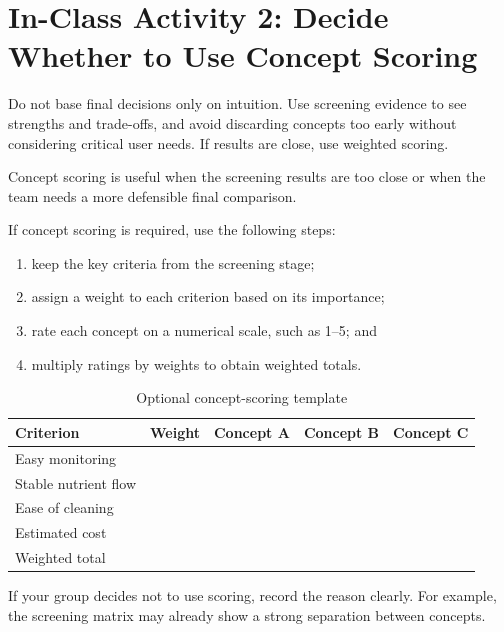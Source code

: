 \section{In-Class Activity 2: Decide Whether to Use Concept Scoring}

\begin{tcolorbox}[title=Common Mistakes]
Do not base final decisions only on intuition. Use screening evidence to see strengths and trade-offs, and avoid discarding concepts too early without considering critical user needs. If results are close, use weighted scoring.
\end{tcolorbox}

Concept scoring is useful when the screening results are too close or when the team needs a more defensible final comparison.

If concept scoring is required, use the following steps:
\begin{enumerate}
    \item keep the key criteria from the screening stage;
    \item assign a weight to each criterion based on its importance;
    \item rate each concept on a numerical scale, such as 1--5; and
    \item multiply ratings by weights to obtain weighted totals.
\end{enumerate}

\begin{table}[htbp]
\centering
\caption{Optional concept-scoring template}
\label{tab:session11-scoring-template}
\renewcommand{\arraystretch}{1.2}
\begin{tabularx}{\textwidth}{|>{\raggedright\arraybackslash}p{}|c|c|c|c|}
\hline
\textbf{Criterion} & \textbf{Weight} & \textbf{Concept A} & \textbf{Concept B} & \textbf{Concept C} \\
\hline
Easy monitoring &  &  &  &  \\
\hline
Stable nutrient flow &  &  &  &  \\
\hline
Ease of cleaning &  &  &  &  \\
\hline
Estimated cost &  &  &  &  \\
\hline
Weighted total &  &  &  &  \\
\hline
\end{tabularx}
\end{table}

If your group decides not to use scoring, record the reason clearly. For example, the screening matrix may already show a strong separation between concepts.

